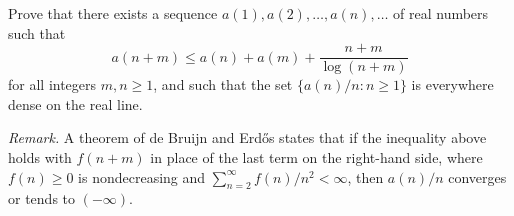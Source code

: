 Prove that there exists a sequence $a(1),a(2),\dots,a(n),\dots$ of real numbers such that
\[
a(n+m)\le a(n)+a(m)+\frac{n+m}{\log (n+m)}
\]for all integers $m,n\ge 1$, and such that the set $\{a(n)/n:n\ge 1\}$ is everywhere dense on the real line.

\textit{Remark.} A theorem of de Bruijn and Erdős states that if the inequality above holds with $f(n + m)$ in place of the last term on the right-hand side, where $f(n)\ge 0$ is nondecreasing and $\sum_{n=2}^\infty f(n)/n^2<\infty$, then $a(n)/n$ converges or tends to $(-\infty)$.